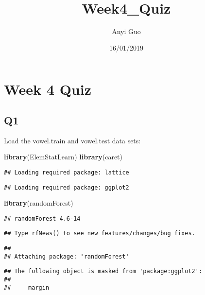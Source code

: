 \documentclass[]{article}
\title{Week4\_Quiz}
\author{Anyi Guo}
\date{16/01/2019}
\newenvironment{Shaded}{\begin{snugshade}}{\end{snugshade}}
\newcommand{\KeywordTok}[1]{\textcolor[rgb]{0.13,0.29,0.53}{\textbf{#1}}}
\newcommand{\NormalTok}[1]{#1}
\begin{document}
\maketitle

\section{Week 4 Quiz}\label{week-4-quiz}

\subsection{Q1}\label{q1}

Load the vowel.train and vowel.test data sets:

\begin{Shaded}
\begin{Highlighting}[]
\KeywordTok{library}\NormalTok{(ElemStatLearn)}
\KeywordTok{library}\NormalTok{(caret)}
\end{Highlighting}
\end{Shaded}

\begin{verbatim}
## Loading required package: lattice
\end{verbatim}

\begin{verbatim}
## Loading required package: ggplot2
\end{verbatim}

\begin{Shaded}
\begin{Highlighting}[]
\KeywordTok{library}\NormalTok{(randomForest)}
\end{Highlighting}
\end{Shaded}

\begin{verbatim}
## randomForest 4.6-14
\end{verbatim}

\begin{verbatim}
## Type rfNews() to see new features/changes/bug fixes.
\end{verbatim}

\begin{verbatim}
## 
## Attaching package: 'randomForest'
\end{verbatim}

\begin{verbatim}
## The following object is masked from 'package:ggplot2':
## 
##     margin
\end{verbatim}
\end{document}
